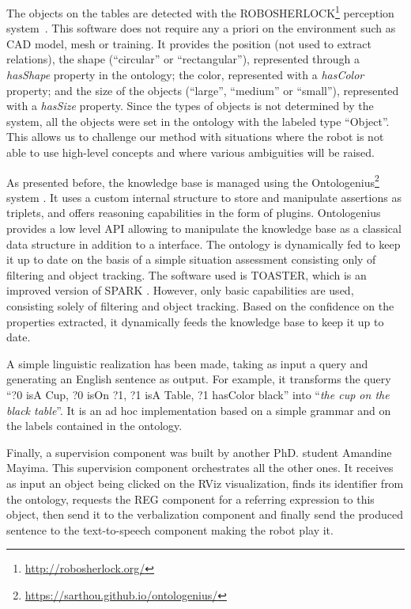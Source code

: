 \documentclass[a4paper,11pt,twoside]{StyleThese}
\begin{document}
The objects on the tables are detected with the ROBOSHERLOCK\footnote{\url{http://robosherlock.org/}} perception system~\cite{beetz2015robosherlock}. This software does not require any a priori on the environment such as CAD model, mesh or training. 
It provides the position (not used to extract relations), the shape (``circular'' or ``rectangular''), represented through a \textit{hasShape} property in the ontology; the color, represented with a \textit{hasColor} property; and the size of the objects (``large'', ``medium'' or ``small''), represented with a \textit{hasSize} property. Since the types of objects is not determined by the system, all the objects were set in the ontology with the labeled type ``Object''. This allows us to challenge our method with situations where the robot is not able to use high-level concepts and where various ambiguities will be raised.

As presented before, the knowledge base is managed using the Ontologenius\footnote{\url{https://sarthou.github.io/ontologenius/}} system \cite{sarthou2019ontologenius}. 
It uses a custom internal structure to store and manipulate assertions as triplets, and offers reasoning capabilities in the form of plugins. Ontologenius provides a low level API allowing to manipulate the knowledge base as a classical data structure in addition to a \sparql{} interface.
The ontology is dynamically fed to keep it up to date on the basis of a simple situation assessment consisting only of filtering and object tracking. The software used is TOASTER, which is an improved version of SPARK \cite{milliez2014framework}. However, only basic capabilities are used, consisting solely of filtering and object tracking. Based on the confidence on the properties extracted, it dynamically feeds the knowledge base to keep it up to date.

A simple linguistic realization has been made, taking as input a \sparql{} query and generating an English sentence as output. For example, it transforms the query ``?0 isA Cup, ?0 isOn ?1, ?1 isA Table, ?1 hasColor black'' into ``\textit{the cup on the black table}''. It is an ad hoc implementation based on a simple grammar and on the labels contained in the ontology. 

Finally, a supervision component was built by another PhD. student Amandine Mayima. This supervision component orchestrates all the other ones. It receives as input an object being clicked on the RViz visualization, finds its identifier from the ontology, requests the REG component for a referring expression to this object, then send it to the verbalization component and finally send the produced sentence to the text-to-speech component making the robot play it.
\end{document}

